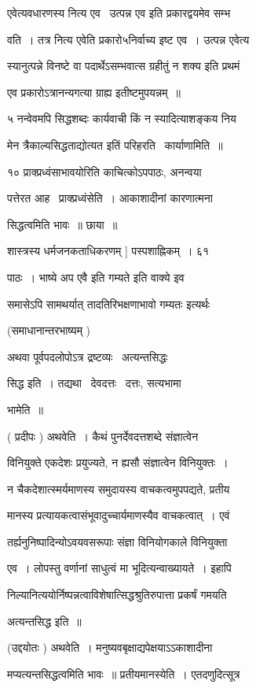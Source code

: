\documentclass[11pt, openany]{book}
\begin{document}
एवेत्यवधारणस्य {\qt नित्य एव \textendash\ उत्पन्न एव} इति प्रकारद्वयमेव सम्भ \textendash\ 

वति~। तत्र नित्य एवेति प्रकारो५निर्वाच्य इष्ट एव~। उत्पन्न एवेत्य \textendash\ 

स्यानुत्पन्ने विनष्टे वा पदार्थेऽसम्भवात्स ग्रहीतुं न शक्य इति प्रथमं 

एव प्रकारोऽत्रानन्यगत्या ग्राह्य इतीष्टमुपयन्नम्~॥ 

५ नन्वेवमपि सिद्धशब्दः कार्यवाची किं न स्यादित्याशङ्कय निय \textendash\ 

मेन त्रैकाल्यसिद्धताद्योत्यत इतिं परिहरति \textendash\ कार्याणामिति~॥ 

१० प्राक्प्रध्वंसाभावयोरिति काचित्कोऽपपाठः, अनन्वया \textendash\ 

पत्तेरत आह \textendash\ प्राक्प्रध्वंसेति~। आकाशादीनां कारणात्मना 

सिद्धत्वमिति भावः~॥ छाया~॥ 

शास्त्रस्य धर्मजनकताधिकरणम् ] पस्पशाह्निकम्~। ६१ 



पाठः~। भाष्ये अप एवै {\qt इति गम्यते} इति वाक्ये इव

समासेऽपि सामथर्यात् तादतिरिभक्षणाभावो गम्यतः इत्यर्थः 

(समाधानान्तरभाष्यम् ) 

अथवा पूर्वपदलोपोऽत्र द्रष्टव्यः \textendash\ अत्यन्तसिद्धः \textendash\ 

सिद्ध इति~। तद्यथा \textendash\ देवदत्तः \textendash\ दत्तः, सत्यभामा \textendash\ 

भामेति~॥ 

( प्रदीपः ) अथवेति~। कैथं पुनर्देवदत्तशब्दे संज्ञात्वेन 

विनियुक्ते एकदेशः प्रयुज्यते, न ह्यसौ संज्ञात्वेन विनियुक्तः~। 

न चैकदेशात्स्मर्यमाणस्य समुदायस्य वाचकत्वमुपपद्यते, प्रतीय \textendash\ 

मानस्य प्रत्यायकत्वासंभूवादुच्चार्यमाणस्यैव वाचकत्वात्~। एवं 

तर्ह्यनुनिष्पादिन्योऽवयवसरूपाः संज्ञा विनियोगकाले विनियुक्ता 

एव~। लोपस्तु वर्णानां साधुत्वं मा भूदित्यन्वाख्यायते~। इहापि 

निल्यानित्ययोर्निष्पन्नत्वाविशेषात्सिद्धश्रुतिरुपात्ता प्रकर्षं गमयति \textendash\ 


अत्यन्तसिद्ध इति~॥ 

(उद्दयोतः ) अथवेति~। मनुष्यवबृक्षाद्यपेक्षयाऽऽकाशादीना \textendash\ 

मप्यत्यन्तसिद्धत्वमिति भावः~॥ प्रतीयमानस्येति~। एतदणुदित्सूत्र 
\end{document}
